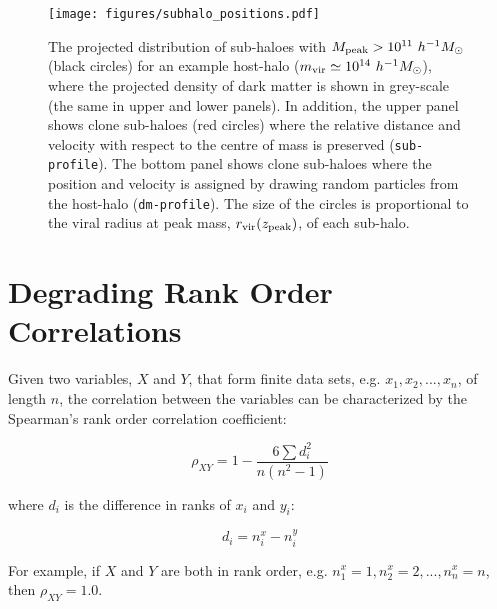 \documentclass[a4paper,fleqn,usenatbib]{mnras}
\begin{document}
%
\begin{figure}
\texttt{[image: figures/subhalo\_positions.pdf]}
\caption{The projected distribution of sub-haloes with $M_{\rm peak}>10^{11}~h^{-1}M_{\odot}$ (black circles) for an example host-halo ($m_{\rm vir}\simeq 10^{14}~h^{-1}M_{\odot}$), where the projected density of dark matter is shown in grey-scale (the same in upper and lower panels).  In addition, the upper panel shows clone sub-haloes (red circles) where the relative distance and velocity with respect to the centre of mass is preserved ({\tt sub-profile}).  The bottom panel shows clone sub-haloes where the position and velocity is assigned by drawing random particles from the host-halo ({\tt dm-profile}).  The size of the circles is proportional to the viral radius at peak mass, $r_{\rm vir}(z_{\rm peak})$, of each sub-halo.}
\label{fig:subhalo_positions}
\end{figure}
%

\section{Degrading Rank Order Correlations}
\label{appendix:ranks}

Given two variables, $X$ and $Y$, that form finite data sets, e.g. $x_1, x_2, ..., x_n$, of length $n$, the correlation between the variables can be characterized by the Spearman's rank order correlation coefficient:
%
\begin{linenomath}
\begin{equation}
\rho_{XY} =1-\frac{6 \sum d_i^2}{n(n^2-1)}
\end{equation}
\end{linenomath}
%
where $d_i$ is the difference in ranks of $x_i$ and $y_i$:
%
\begin{linenomath}
\begin{equation}
d_i = n_i^x- n_i^y
\end{equation}
\end{linenomath}
%
For example, if $X$ and $Y$ are both in rank order, e.g. $n_1^x = 1, n_2^x=2, ..., n_n^x = n$, then $\rho_{XY}=1.0$.
\end{document}

